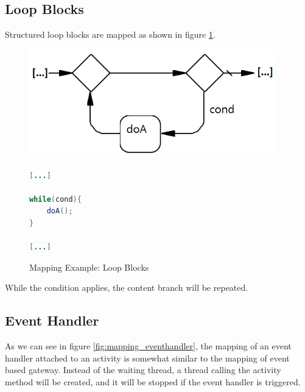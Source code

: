 \subsection{Loop Blocks}
Structured loop blocks are mapped as shown in figure \ref{fig:mapping_loop}.
\begin{figure}[h]
\begin{minipage}[c]{0.5\textwidth}
	\includegraphics[width=0.95\textwidth]{images/mapping/loop_block.png}
\end{minipage}
\begin{minipage}[c]{0.5\textwidth}
\begin{lstlisting}[language=Java]
[...]

while(cond){
	doA();
}

[...]
\end{lstlisting}
\end{minipage}
\caption{Mapping Example: Loop Blocks }%
\label{fig:mapping_loop}%
\end{figure}

While the condition applies, the content branch will be repeated. 

\newpage
\subsection{Event Handler}
\label{sec:handler}
As we can see in figure \ref{fig:mapping_eventhandler}, the mapping of an event handler attached to an activity is somewhat similar to the mapping of event based gateway. Instead of the waiting thread, a thread calling the activity method will be created, and it will be stopped if the event handler is triggered.\\

